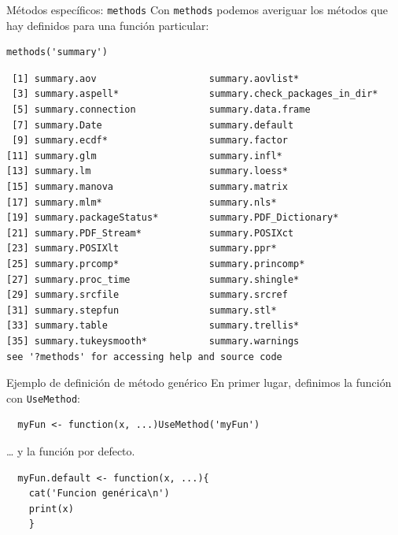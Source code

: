 \documentclass[xcolor={usenames,svgnames,dvipsnames}]{beamer}
\begin{document}
\begin{frame}[label={sec:org1acb3de},fragile]{Métodos específicos: \texttt{methods}}
 Con \texttt{methods} podemos averiguar los métodos que hay definidos para una función particular:
\lstset{language=r,label= ,caption= ,captionpos=b,numbers=none}
\begin{lstlisting}
methods('summary')
\end{lstlisting}

\begin{verbatim}
 [1] summary.aov                    summary.aovlist*              
 [3] summary.aspell*                summary.check_packages_in_dir*
 [5] summary.connection             summary.data.frame            
 [7] summary.Date                   summary.default               
 [9] summary.ecdf*                  summary.factor                
[11] summary.glm                    summary.infl*                 
[13] summary.lm                     summary.loess*                
[15] summary.manova                 summary.matrix                
[17] summary.mlm*                   summary.nls*                  
[19] summary.packageStatus*         summary.PDF_Dictionary*       
[21] summary.PDF_Stream*            summary.POSIXct               
[23] summary.POSIXlt                summary.ppr*                  
[25] summary.prcomp*                summary.princomp*             
[27] summary.proc_time              summary.shingle*              
[29] summary.srcfile                summary.srcref                
[31] summary.stepfun                summary.stl*                  
[33] summary.table                  summary.trellis*              
[35] summary.tukeysmooth*           summary.warnings              
see '?methods' for accessing help and source code
\end{verbatim}
\end{frame}

\begin{frame}[label={sec:orgc41da76},fragile]{Ejemplo de definición de método genérico}
 En primer lugar, definimos la función con \texttt{UseMethod}:
\lstset{language=r,label= ,caption= ,captionpos=b,numbers=none}
\begin{lstlisting}
  myFun <- function(x, ...)UseMethod('myFun')
\end{lstlisting}

\ldots{} y la función por defecto.
\lstset{language=r,label= ,caption= ,captionpos=b,numbers=none}
\begin{lstlisting}
  myFun.default <- function(x, ...){
    cat('Funcion genérica\n')
    print(x)
    }
\end{lstlisting}
\end{frame}
\end{document}
